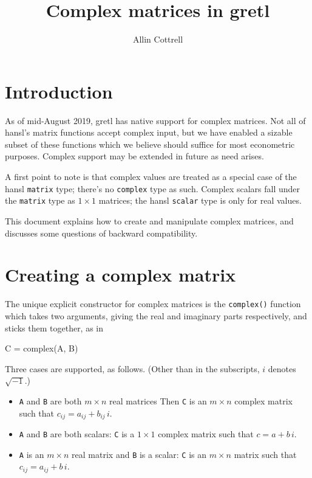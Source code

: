 \documentclass{article}
\begin{document}
\setlength{\parindent}{0pt}
\setlength{\parskip}{1ex}
\setcounter{secnumdepth}{2}

\title{Complex matrices in gretl}
\author{Allin Cottrell}
\maketitle

\section{Introduction}
\label{sec:intro}

As of mid-August 2019, gretl has native support for complex
matrices. Not all of hansl's matrix functions accept complex input,
but we have enabled a sizable subset of these functions which we
believe should suffice for most econometric purposes. Complex support
may be extended in future as need arises.

A first point to note is that complex values are treated as a special
case of the hansl \texttt{matrix} type; there's no \texttt{complex}
type as such. Complex scalars fall under the \texttt{matrix} type as
$1 \times 1$ matrices; the hansl \texttt{scalar} type is only for real
values.

This document explains how to create and manipulate complex matrices,
and discusses some questions of backward compatibility.

\section{Creating a complex matrix}
\label{sec:create}

The unique explicit constructor for complex matrices is the
\texttt{complex()} function which takes two arguments, giving the real
and imaginary parts respectively, and sticks them together, as in
\begin{code}
C = complex(A, B)
\end{code}
Three cases are supported, as follows. (Other than in the subscripts,
$i$ denotes $\sqrt{-1}$.)
\begin{itemize}
\item \texttt{A} and \texttt{B} are both $m \times n$ real matrices
  Then \texttt{C} is an $m \times n$ complex matrix such that
  $c_{ij} = a_{ij} + b_{ij}\,i$.
\item \texttt{A} and \texttt{B} are both scalars: \texttt{C} is a
  $1 \times 1$ complex matrix such that $c = a + b\,i$.
\item \texttt{A} is an $m \times n$ real matrix and \texttt{B} is a
  scalar: \texttt{C} is an $m \times n$ matrix such that
  $c_{ij} = a_{ij} + b\,i$.
\end{itemize}
\end{document}
